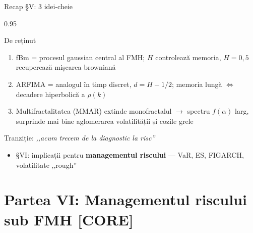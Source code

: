 \documentclass[9pt, aspectratio=169, t]{beamer}
\begin{document}
\begin{frame}[shrink=15]{Recap §V: 3 idei-cheie}
\begin{cminipage}{0.95\textwidth}
\begin{block}{De reținut}
\begin{enumerate}\setlength{\itemsep}{4pt}
    \item fBm = procesul gaussian central al FMH; $H$ controlează memoria, $H=0{,}5$ recuperează mișcarea browniană
    \item ARFIMA = analogul în timp discret, $d=H-1/2$; memoria lungă $\Leftrightarrow$ decadere hiperbolică a $\rho(k)$
    \item Multifractalitatea (MMAR) extinde monofractalul $\to$ spectru $f(\alpha)$ larg, surprinde mai bine aglomerarea volatilității și cozile grele
\end{enumerate}
\end{block}
\begin{exampleblock}{Tranziție: \textit{,,acum trecem de la diagnostic la risc''}}
\begin{itemize}\setlength{\itemsep}{0pt}
    \item §VI: implicații pentru \textbf{managementul riscului} --- VaR, ES, FIGARCH, volatilitate ,,rough''
\end{itemize}
\end{exampleblock}
\end{cminipage}
\end{frame}

\section{Partea VI: Managementul riscului sub FMH [CORE]}
\end{document}
